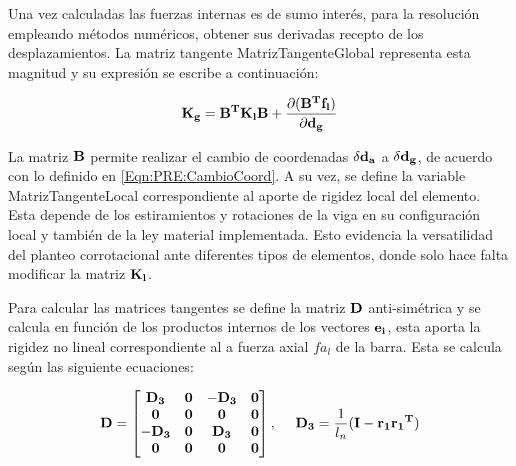 Una vez calculadas las fuerzas internas es de sumo interés, para la resolución empleando métodos numéricos, obtener sus derivadas recepto de los desplazamientos. La matriz tangente \gls{MatrizTangenteGlobal} representa esta magnitud y su expresión se escribe a continuación:

\begin{equation}\label{Eqn:PRE:MatrizKest1}
\bf{K_g}=\bf{B}^T\bf{K_l}\bf{B}+\frac{\partial (\bf{B}^T\bf{f}_l)}{\partial \bf{d}_g}
\end{equation}


La matriz $\bf{B}$ permite realizar el cambio de coordenadas $\delta \bf{d_a}$ a  $\delta \bf{d_g}$, de acuerdo con lo definido en \eqref{Eqn:PRE:CambioCoord}. A su vez, se define la variable \gls{MatrizTangenteLocal} correspondiente al aporte de rigidez local del elemento. Esta depende de los estiramientos y rotaciones de la viga en su configuración local y también de la ley material implementada. Esto evidencia la versatilidad del planteo corrotacional ante diferentes tipos de elementos, donde solo hace falta modificar la matriz $\bf{K_l}$.

Para calcular las matrices tangentes se define la matriz  $\bf{D}$  anti-simétrica y se calcula en función de los productos internos de los vectores $\bf{e_i}$, esta aporta la rigidez no lineal correspondiente al a fuerza axial $fa_l$ de la barra. Esta se calcula según las siguiente ecuaciones:

\begin{equation}
	\label{Eqn:PRE:DefD}
	\bf{D}=\begin{bmatrix}
	\bf{D_3}& \bf{0}   & -\bf{D_3}   & \bf{0} \\
	\bf{0}  & \bf{0} & \bf{0}   & \bf{0}\\
	-\bf{D_3}  & \bf{0}   & \bf{D_3} & \bf{0} \\
	\bf{0}  & \bf{0}   & \bf{0}   & \bf{0}
\end{bmatrix},~~~~\bf{D_3}=\frac{\text{1}}{\text{$l_n$}}(\bf{I}-\bf{r_1}\bf{r_1}^T)
\end{equation}

